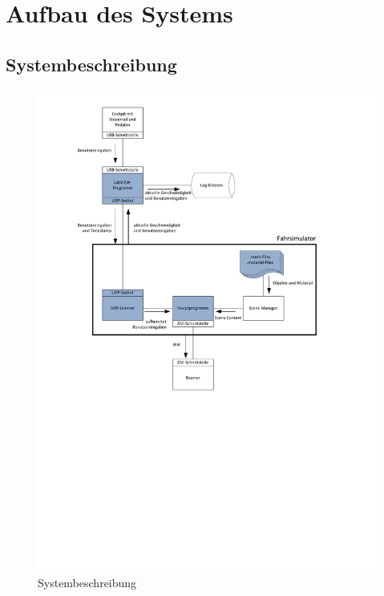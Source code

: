 \section{Aufbau des Systems}
\subsection{Systembeschreibung}

\begin{figure}[H]
\centering 
\includegraphics{src/Systembeschreibung.pdf}
\caption{Systembeschreibung} %
\label{Systembeschreibung} %
\end{figure}

